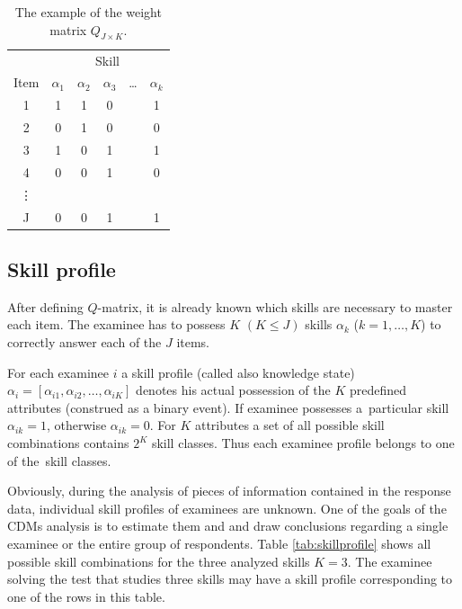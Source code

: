 \documentclass[english]{pwr_wmat_praca_dyplomowa}
\theoremstyle{plain}
\theoremstyle{definition}
\numberwithin{theorem}{chapter}
\begin{document}
\begin{table}[H]
	\centering
	\begin{tabular}{c c c c c c} 
		\hline
		{\rule{0pt}{3ex}} & \multicolumn{5}{c}{Skill} \\
		Item & $\alpha_1$ & $\alpha_2$ & $\alpha_3$ & \ldots & $\alpha_k$ \\ [0.5ex] 
		\hline
		1 & 1 & 1 & 0 & & 1 \\ 
		2 & 0 & 1 & 0 & & 0 \\
		3 & 1 & 0 & 1 & & 1 \\
		4 & 0 & 0 & 1 & & 0 \\
		\vdots & & & & & \\
		J & 0 & 0 & 1 & & 1\\ [1ex] 
		\hline
	\end{tabular}
	\caption{The example of the weight matrix $Q_{J \times K}$.}
	\label{tab:qmatrix} 
\end{table}

\subsection{Skill profile}\label{subsec:skill_prof}

After defining $Q$-matrix, it is already known which skills are necessary to master each item. The examinee has to possess  $K$ $(K\leq J)$ skills $\alpha_k$ ($k=1,\ldots,K$) to correctly answer each of the $J$ items. 

For each examinee $i$ a skill profile (called also knowledge state) $\alpha_i = [\alpha_{i1}, \alpha_{i2}, \ldots, \alpha_{iK}]$ denotes his actual possession of the $K$ predefined attributes (construed as a binary event). If examinee possesses a~particular skill $\alpha_{ik}=1$, otherwise $\alpha_{ik}=0$. For $K$ attributes a set of all possible skill combinations contains $2^K$ skill classes. Thus each examinee profile belongs to one of the~skill classes. 

Obviously, during the analysis of pieces of information contained in the response data, individual skill profiles of examinees are unknown. One of the goals of the CDMs analysis is to estimate them and and draw conclusions regarding a single examinee or the entire group of respondents. Table \ref{tab:skillprofile} shows all possible skill combinations for the three analyzed skills $K=3$. The examinee solving the test that studies three skills may have a skill profile corresponding to one of the rows in this table.
\end{document}

